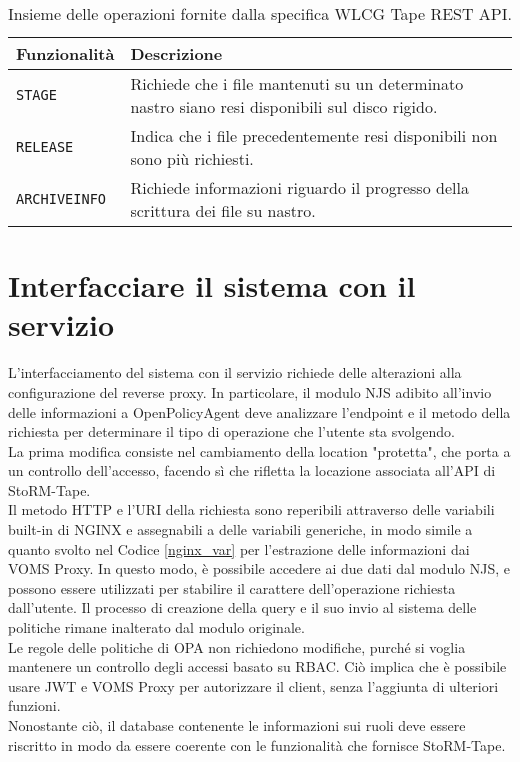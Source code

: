\begin{table}
\begin{center}
\begin{tabular}{ | m{7em} | m{18em} | } 
  \hline
  \textbf{Funzionalità} & \textbf{Descrizione} \\ 
  \hline
  \texttt{STAGE} & Richiede che i file mantenuti su un determinato nastro siano resi disponibili sul disco rigido. \\ 
  \hline
  \texttt{RELEASE} & Indica che i file precedentemente resi disponibili non sono più richiesti. \\ 
  \hline
  \texttt{ARCHIVEINFO} & Richiede informazioni riguardo il progresso della scrittura dei file su nastro. \\ 
  \hline
\end{tabular}
\caption{\label{tab:table-name} Insieme delle operazioni fornite dalla specifica WLCG Tape REST API.}
\end{center}
\end{table}

\section{Interfacciare il sistema con il servizio}
L'interfacciamento del sistema con il servizio richiede delle alterazioni alla configurazione del reverse proxy. In particolare, 
il modulo NJS adibito all'invio delle informazioni a OpenPolicyAgent deve analizzare l'endpoint e il metodo della richiesta per 
determinare il tipo di operazione che l'utente sta svolgendo.
\\ La prima modifica consiste nel cambiamento della location "protetta", che porta a un controllo dell'accesso, 
facendo sì che rifletta la locazione associata all'API di StoRM-Tape.  
\\ Il metodo HTTP e l'URI della richiesta sono reperibili attraverso delle variabili built-in di NGINX e assegnabili 
a delle variabili generiche, in modo simile a quanto svolto
nel Codice \ref*{nginx_var} per l'estrazione delle informazioni dai VOMS Proxy. In questo modo, è possibile accedere ai due dati dal modulo NJS,
 e possono essere utilizzati per stabilire il carattere dell'operazione richiesta dall'utente. Il processo di creazione della query e il suo invio al
  sistema delle politiche rimane inalterato dal modulo originale. 
\\ Le regole delle politiche di OPA non richiedono modifiche, purché si voglia mantenere un controllo degli accessi basato su RBAC. Ciò implica che è possibile usare JWT e VOMS Proxy 
per autorizzare il client, senza l'aggiunta di ulteriori funzioni. 
\\ Nonostante ciò, il database contenente le informazioni sui ruoli deve essere riscritto in modo da essere coerente con 
le funzionalità che fornisce StoRM-Tape. 

